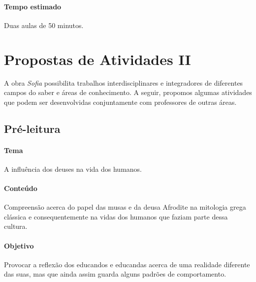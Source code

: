 \documentclass[12pt]{extarticle}
\begin{document}
\paragraph{Tempo estimado} Duas aulas de 50 minutos.

\pagebreak\section{Propostas de Atividades II}


A obra \emph{\textit{Sofia}} possibilita trabalhos interdisciplinares e integradores de
diferentes campos do saber e áreas de conhecimento. A seguir, propomos algumas
atividades que podem ser desenvolvidas conjuntamente com professores de outras
áreas. %


\subsection{Pré-leitura} 

\paragraph{Tema} A influência dos deuses na vida dos humanos.

\paragraph{Conteúdo} Compreensão acerca do papel das musas e da deusa Afrodite
na mitologia grega clássica e consequentemente na vidas dos humanos que faziam parte dessa cultura.

\paragraph{Objetivo} Provocar a reflexão dos educandos e educandas acerca de
uma realidade diferente das suas, mas que ainda assim guarda alguns padrões 
de comportamento. 
\end{document}
